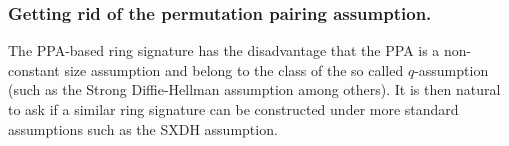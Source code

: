


\subsubsection{Getting rid of the permutation pairing assumption.}

The PPA-based ring signature has the disadvantage that the PPA is a non-constant size assumption and belong to the class of the so called $q$-assumption (such as the Strong Diffie-Hellman assumption among others). It is then natural to ask if a similar ring signature can be constructed under more standard assumptions such as the SXDH assumption.
 
